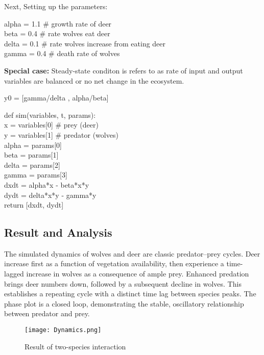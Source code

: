 \documentclass[12pt]{article}
\begin{document}
Next, Setting up the parameters:
\begin{tcolorbox}[title= Model Parameters]
alpha = 1.1   # growth rate of deer\\
beta = 0.4    # rate wolves eat deer\\
delta = 0.1   # rate wolves increase from eating deer\\
gamma = 0.4   # death rate of wolves
\end{tcolorbox}
\textbf{Special case:} Steady-state conditon is refers to as rate of input and output variables are balanced or no net change in the ecosystem.

\begin{tcolorbox}[title= Steady-State Condition]
    y0 = [gamma/delta , alpha/beta]
\end{tcolorbox}

\begin{tcolorbox}[title= Model Function] 
    def sim(variables, t, params):\\
    x = variables[0]  # prey (deer)\\
    y = variables[1]  # predator (wolves)\\

    alpha = params[0]\\
    beta = params[1]\\
    delta = params[2]\\
    gamma = params[3]\\

    dxdt = alpha*x - beta*x*y \\ 
    dydt = delta*x*y - gamma*y\\

    return [dxdt, dydt]

\end{tcolorbox}

\subsection{Result and Analysis}
The simulated dynamics of wolves and deer are classic predator–prey cycles. Deer increase first as a function of vegetation availability, then experience a time-lagged increase in wolves as a consequence of ample prey. Enhanced predation brings deer numbers down, followed by a subsequent decline in wolves. This establishes a repeating cycle with a distinct time lag between species peaks. The phase plot is a closed loop, demonstrating the stable, oscillatory relationship between predator and prey.
\begin{figure}[h]
    \centering
    \texttt{[image: Dynamics.png]}
    \caption{Result of two-species interaction}
    \label{fig:enter-label}
\end{figure}
\end{document}
